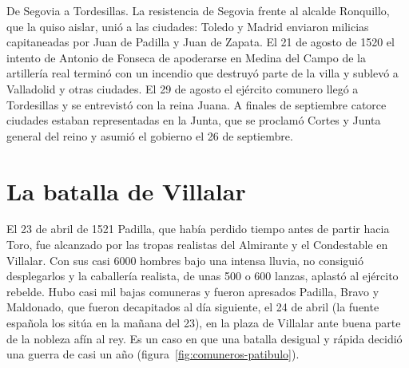 \documentclass{book}
\begin{document}

De Segovia a Tordesillas. La resistencia de Segovia frente al alcalde Ronquillo, que la quiso aislar, unió a las ciudades: Toledo y Madrid enviaron milicias capitaneadas por Juan de Padilla y Juan de Zapata. El 21 de agosto de 1520 el intento de Antonio de Fonseca de apoderarse en Medina del Campo de la artillería real terminó con un incendio que destruyó parte de la villa y sublevó a Valladolid y otras ciudades. El 29 de agosto el ejército comunero llegó a Tordesillas y se entrevistó con la reina Juana. A finales de septiembre catorce ciudades estaban representadas en la Junta, que se proclamó Cortes y Junta general del reino y asumió el gobierno el 26 de septiembre.


\section{La batalla de Villalar}

El 23 de abril de 1521 Padilla, que había perdido tiempo antes de partir hacia Toro, fue alcanzado por las tropas realistas del Almirante y el Condestable en Villalar. Con sus casi 6000 hombres bajo una intensa lluvia, no consiguió desplegarlos y la caballería realista, de unas 500 o 600 lanzas, aplastó al ejército rebelde. Hubo casi mil bajas comuneras y fueron apresados Padilla, Bravo y Maldonado, que fueron decapitados al día siguiente, el 24 de abril (la fuente española los sitúa en la mañana del 23), en la plaza de Villalar ante buena parte de la nobleza afín al rey. Es un caso en que una batalla desigual y rápida decidió una guerra de casi un año (figura~\ref{fig:comuneros-patibulo}).

\end{document}

